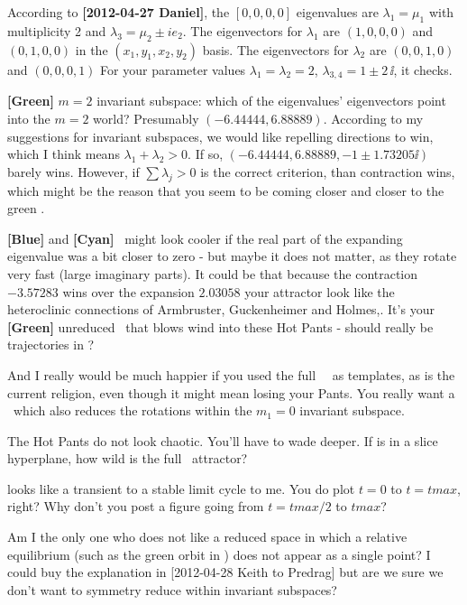 \begin{description}
According to {\bf [2012-04-27 Daniel]},
the $[0,0,0,0]$ eigenvalues are $\lambda_1 = \mu_1$ with multiplicity 2 and
             $\lambda_3 = \mu_2 \pm i e_2$. The eigenvectors for
             $\lambda_1$ are $(1,0,0,0)$ and $(0,1,0,0)$ in the
             $(x_1,y_1,x_2,y_2)$ basis.
             The eigenvectors for
             $\lambda_2$ are $(0,0,1,0)$ and $(0,0,0,1)$
For your parameter values
             $\lambda_1 = \lambda_2= 2$,
             $\lambda_{3,4} = 1 \pm  2\,\ii$, it checks.

{\bf [Green]} $m=2$ invariant subspace: which of the eigenvalues' eigenvectors
    point into the $m=2$ world? Presumably $(-6.44444,6.88889)$.
    According to my suggestions for invariant subspaces, we would like
    repelling directions to win, which I think means $\lambda_1+\lambda_2
    >0$. If so, $(-6.44444,6.88889,-1 \pm 1.73205\ii)$ barely wins.
    However, if $\sum \lambda_j >0$ is the correct criterion, than contraction
    wins, which might be the reason that you seem to be coming closer and
    closer to the green \rpo.

{\bf [Blue]} and {\bf [Cyan]} \eqva\ might look cooler if the real part
of the expanding eigenvalue was a bit closer to zero - but maybe it does
not matter, as they rotate very fast (large imaginary parts). It could be that
because the contraction $-3.57283$ wins over the expansion $2.03058$ your attractor
look like the heteroclinic
connections of Armbruster, Guckenheimer and Holmes,. It's your
{\bf [Green]} unreduced \rpo\ that blows wind into these Hot Pants - should really
be trajectories in \reducedsp?

And I really would be much happier if you used the full \statesp\ \eqva\
as templates, as is the current religion, even though it might mean
losing your Pants.  You really want a \slice\ which also reduces the
rotations within the $m_1=0$ invariant subspace.

\item[2012-04-28 Predrag] The Hot Pants do not look chaotic.  You'll have
to wade deeper. If \reffig{fig:2moderedmultieq} is in a slice hyperplane,
how wild is the full \statesp\ attractor?

\item[2012-04-28 Evangelos to Keith]  looks like a transient
to a stable limit cycle to me. You do plot $t=0$ to $t=tmax$, right? Why don't
you post a figure going from $t=tmax/2$ to $tmax$? 

\item[2012-04-28 Evangelos to All] Am I the only one who does not like a reduced
space in which a relative equilibrium (such as the green orbit in 
\reffig{fig:2moderedmultieq}) does not appear as a single point?
I could buy the explanation in [2012-04-28 Keith to Predrag] but are we sure we
don't want to symmetry reduce within invariant subspaces?

\end{description}
